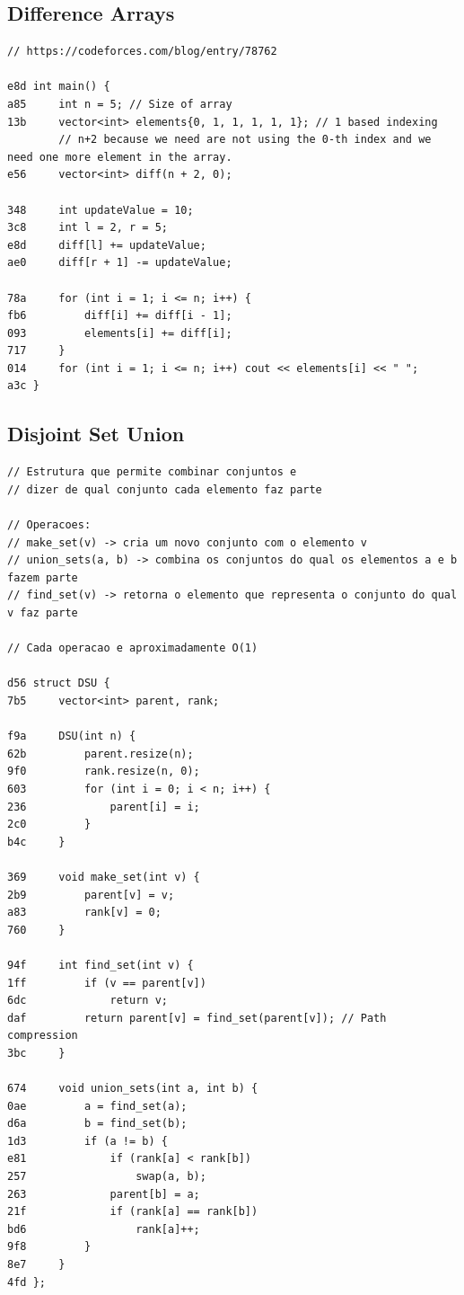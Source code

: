 \documentclass[11pt, a4paper, twoside]{article}
\begin{document}
\subsection{Difference Arrays}
\begin{lstlisting}
// https://codeforces.com/blog/entry/78762

e8d int main() {
a85 	int n = 5; // Size of array
13b 	vector<int> elements{0, 1, 1, 1, 1, 1}; // 1 based indexing
        // n+2 because we need are not using the 0-th index and we need one more element in the array.
e56 	vector<int> diff(n + 2, 0); 
    	
348 	int updateValue = 10;
3c8 	int l = 2, r = 5;
e8d 	diff[l] += updateValue;
ae0 	diff[r + 1] -= updateValue;
    	
78a 	for (int i = 1; i <= n; i++) {
fb6 		diff[i] += diff[i - 1];
093 		elements[i] += diff[i];
717 	}
014 	for (int i = 1; i <= n; i++) cout << elements[i] << " ";
a3c }
\end{lstlisting}

\subsection{Disjoint Set Union}
\begin{lstlisting}
// Estrutura que permite combinar conjuntos e 
// dizer de qual conjunto cada elemento faz parte

// Operacoes:
// make_set(v) -> cria um novo conjunto com o elemento v
// union_sets(a, b) -> combina os conjuntos do qual os elementos a e b fazem parte
// find_set(v) -> retorna o elemento que representa o conjunto do qual v faz parte

// Cada operacao e aproximadamente O(1)

d56 struct DSU {
7b5     vector<int> parent, rank;
    
f9a     DSU(int n) {
62b         parent.resize(n);
9f0         rank.resize(n, 0);
603         for (int i = 0; i < n; i++) {
236             parent[i] = i;
2c0         }
b4c     }
    
369     void make_set(int v) {
2b9         parent[v] = v;
a83         rank[v] = 0;
760     }
    
94f     int find_set(int v) {
1ff         if (v == parent[v])
6dc             return v;
daf         return parent[v] = find_set(parent[v]); // Path compression
3bc     }
    
674     void union_sets(int a, int b) {
0ae         a = find_set(a);
d6a         b = find_set(b);
1d3         if (a != b) {
e81             if (rank[a] < rank[b])
257                 swap(a, b);
263             parent[b] = a;
21f             if (rank[a] == rank[b])
bd6                 rank[a]++;
9f8         }
8e7     }
4fd };
\end{lstlisting}
\end{document}
